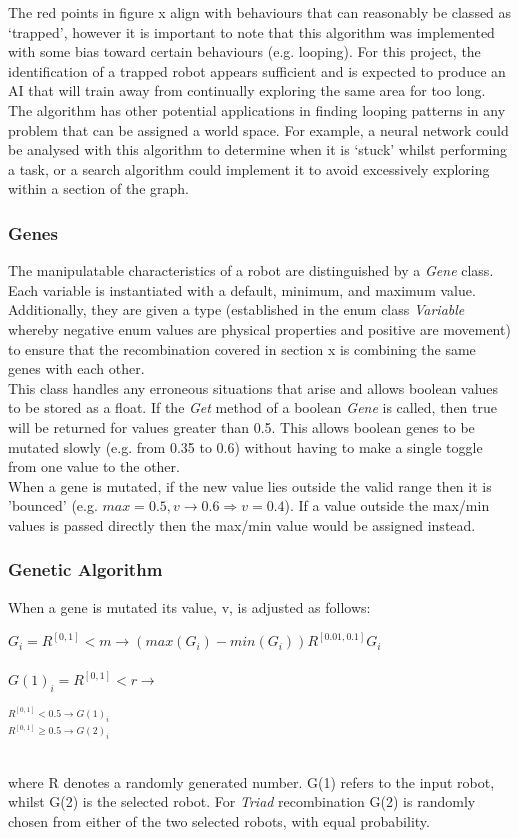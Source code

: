 \documentclass{article}
\begin{document}
The red points in figure x align with behaviours that can reasonably be classed as ‘trapped’, however it is important to note that this algorithm was implemented with some bias toward certain behaviours (e.g. looping). For this project, the identification of a trapped robot appears sufficient and is expected to produce an AI that will train away from continually exploring the same area for too long. The algorithm has other potential applications in finding looping patterns in any problem that can be assigned a world space. For example, a neural network could be analysed with this algorithm to determine when it is ‘stuck’ whilst performing a task, or a search algorithm could implement it to avoid excessively exploring within a section of the graph. 


\subsubsection{Genes}
The manipulatable characteristics of a robot are distinguished by a \textit{Gene} class. Each variable is instantiated with a default, minimum, and maximum value. Additionally, they are given a type (established in the enum class \textit{Variable} whereby negative enum values are physical properties and positive are movement) to ensure that the recombination covered in section x is combining the same genes with each other. \\
This class handles any erroneous situations that arise and allows boolean values to be stored as a float. If the \textit{Get} method of a boolean \textit{Gene} is called, then true will be returned for values greater than 0.5. This allows boolean genes to be mutated slowly (e.g. from 0.35 to 0.6) without having to make a single toggle from one value to the other. \\
When a gene is mutated, if the new value lies outside the valid range then it is 'bounced' (e.g. $max=0.5, v\rightarrow0.6 \Rightarrow v=0.4$). If a value outside the max/min values is passed directly then the max/min value would be assigned instead.

\subsubsection{Genetic Algorithm}
When a gene is mutated its value, v, is adjusted as follows:
\begin{Large}
$G_{i} = R^{[0, 1]} < m \longrightarrow 
(max(G_{i}) - min(G_{i})) R^{[0.01, 0.1]}  G_{i}$\\\\
$G(1)_{i} = R^{[0, 1]} < r \longrightarrow$ 
\begin{LARGE}
$^{R^{[0, 1]} < 0.5\longrightarrow G(1)_{i}} 
_{R^{[0, 1]} \geq 0.5 \longrightarrow G(2)_{i}}$\\\\
\end{LARGE}

\end{Large}
where R denotes a randomly generated number. G(1) refers to the input robot, whilst G(2) is the selected robot. For \textit{Triad} recombination G(2) is randomly chosen from either of the two selected robots, with equal probability.
\end{document}
